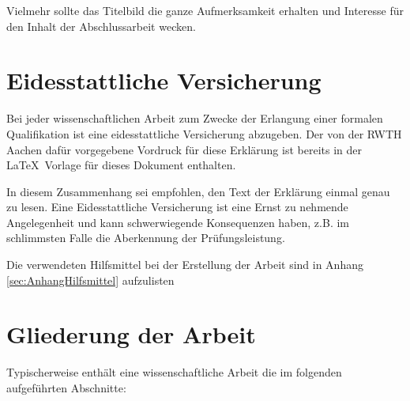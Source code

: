 Vielmehr sollte das Titelbild die ganze Aufmerksamkeit erhalten und Interesse für den Inhalt der Abschlussarbeit wecken.



\section{Eidesstattliche Versicherung}\label{sec:eidesstattlich}
Bei jeder wissenschaftlichen Arbeit zum Zwecke der Erlangung einer formalen Qualifikation ist eine eidesstattliche Versicherung abzugeben.
Der von der RWTH Aachen dafür vorgegebene Vordruck für diese Erklärung ist bereits in der \LaTeX\ Vorlage für dieses Dokument enthalten.

In diesem Zusammenhang sei empfohlen, den Text der Erklärung einmal genau zu lesen. Eine Eidesstattliche Versicherung ist eine Ernst zu nehmende Angelegenheit und kann schwerwiegende Konsequenzen haben, z.B. im schlimmsten Falle die Aberkennung der Prüfungsleistung.

Die verwendeten Hilfsmittel bei der Erstellung der Arbeit sind in Anhang \ref{sec:AnhangHilfsmittel} aufzulisten
\clearpage

\section{Gliederung der Arbeit\label{sec:kap_seiten}}
Typischerweise enthält eine wissenschaftliche Arbeit die im folgenden aufgeführten Abschnitte:

